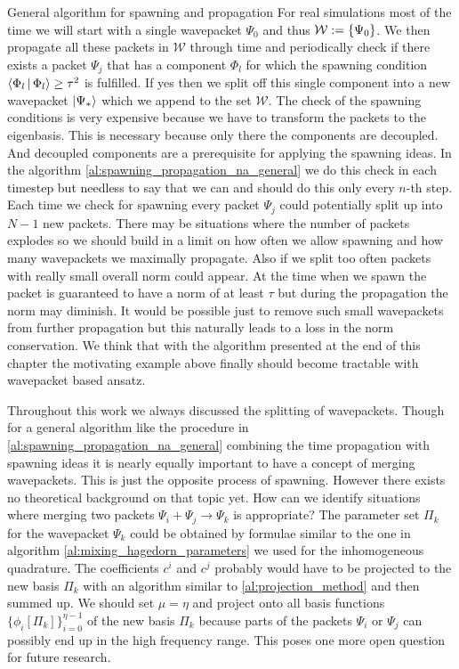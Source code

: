 \begin{chapter}{General algorithm for spawning and propagation}
For real simulations most of the time we will start with a single wavepacket $\Psi_0$
and thus $\mathcal{W} := \{\Psi_0\}$. We then propagate all these packets in $\mathcal{W}$
through time and periodically check if there exists a packet $\Psi_j$ that has a component $\Phi_l$
for which the spawning condition $\Braket{\Phi_l | \Phi_l} \geq \tau^2$ is fulfilled.
If yes then we split off this single component into a new wavepacket $\Ket{\Psi_*}$
which we append to the set $\mathcal{W}$. The check of the spawning conditions is
very expensive because we have to transform the packets to the eigenbasis. This is
necessary because only there the components are decoupled. And decoupled components
are a prerequisite for applying the spawning ideas. In the algorithm
\ref{al:spawning_propagation_na_general} we do this check
in each timestep but needless to say that we can and should do this only every
$n$-th step. Each time we check for spawning every packet $\Psi_j$ could potentially
split up into $N-1$ new packets. There may be situations where the number of packets
explodes so we should build in a limit on how often we allow spawning and how many
wavepackets we maximally propagate. Also if we split too often packets with really
small overall norm could appear. At the time when we spawn the packet is guaranteed
to have a norm of at least $\tau$ but during the propagation the norm may diminish.
It would be possible just to remove such small wavepackets from further propagation
but this naturally leads to a loss in the norm conservation. We think that with
the algorithm presented at the end of this chapter the motivating example above
finally should become tractable with wavepacket based ansatz.

Throughout this work we always discussed the splitting of wavepackets. Though for
a general algorithm like the procedure in \ref{al:spawning_propagation_na_general} combining the
time propagation with spawning ideas it is nearly equally important to have a concept
of merging wavepackets. This is just the opposite process of spawning. However there
exists no theoretical background on that topic yet. How can we identify situations
where merging two packets $\Psi_i + \Psi_j \rightarrow \Psi_k$ is appropriate? The
parameter set $\Pi_k$ for the wavepacket $\Psi_k$ could be obtained by formulae similar
to the one in algorithm \ref{al:mixing_hagedorn_parameters} we used for the inhomogeneous
quadrature. The coefficients $c^i$ and $c^j$ probably would have to be projected
to the new basis $\Pi_k$ with an algorithm similar to \ref{al:projection_method}
and then summed up. We should set $\mu = \eta$ and project onto all basis functions
$\{\phi_i[\Pi_k]\}_{i=0}^{\eta-1}$ of the new basis $\Pi_k$ because parts of the
packets $\Psi_i$ or $\Psi_j$ can possibly end up in the high frequency range.
This poses one more open question for future research.


\end{chapter}

